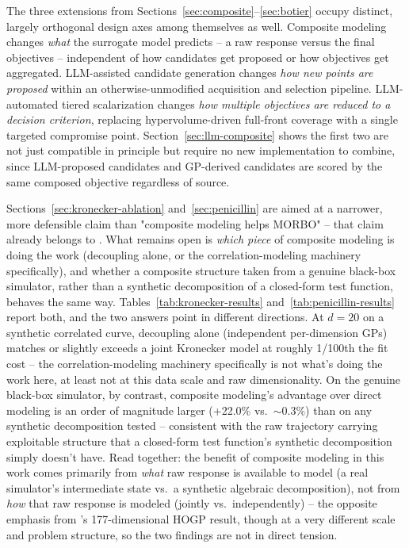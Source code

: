 \documentclass[11pt]{article}
\begin{document}
The three extensions from Sections~\ref{sec:composite}--\ref{sec:botier}
occupy distinct, largely orthogonal design axes among themselves as well.
Composite modeling changes
\emph{what} the surrogate model predicts -- a raw response versus the final
objectives -- independent of how candidates get proposed or how objectives
get aggregated. LLM-assisted candidate generation changes \emph{how new
points are proposed} within an otherwise-unmodified acquisition and
selection pipeline. LLM-automated tiered scalarization changes \emph{how
multiple objectives are reduced to a decision criterion}, replacing
hypervolume-driven full-front coverage with a single targeted compromise
point. Section~\ref{sec:llm-composite} shows the first two are not just
compatible in principle but require no new implementation to combine, since
LLM-proposed candidates and GP-derived candidates are scored by the same
composed objective regardless of source.

Sections~\ref{sec:kronecker-ablation} and~\ref{sec:penicillin} are aimed at
a narrower, more defensible claim than "composite modeling helps MORBO" --
that claim already belongs to \citet{maddox2021hogp}. What remains open is
\emph{which piece} of composite modeling is doing the work (decoupling
alone, or the correlation-modeling machinery specifically), and whether a
composite structure taken from a genuine black-box simulator, rather than a
synthetic decomposition of a closed-form test function, behaves the same
way. Tables~\ref{tab:kronecker-results} and~\ref{tab:penicillin-results}
report both, and the two answers point in different directions. At $d=20$
on a synthetic correlated curve, decoupling alone (independent per-dimension
GPs) matches or slightly exceeds a joint Kronecker model at roughly
1/100th the fit cost -- the correlation-modeling machinery specifically is
not what's doing the work here, at least not at this data scale and raw
dimensionality. On the genuine black-box simulator, by contrast, composite
modeling's advantage over direct modeling is an order of magnitude larger
(+22.0\% vs.\ $\sim$0.3\%) than on any synthetic decomposition tested --
consistent with the raw trajectory carrying exploitable structure that a
closed-form test function's synthetic decomposition simply doesn't have.
Read together: the benefit of composite modeling in this work comes
primarily from \emph{what} raw response is available to model (a real
simulator's intermediate state vs.\ a synthetic algebraic decomposition),
not from \emph{how} that raw response is modeled (jointly vs.\
independently) -- the opposite emphasis from \citeauthor{maddox2021hogp}'s
177-dimensional HOGP result, though at a very different scale and problem
structure, so the two findings are not in direct tension.
\end{document}
